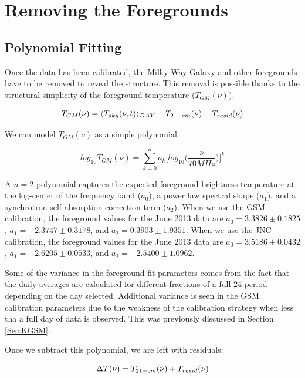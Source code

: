 \section{Removing the Foregrounds}\label{Sec:fore}


\subsection{Polynomial Fitting}

Once the data has been calibrated, the Milky Way Galaxy and other foregrounds have to be removed to reveal the \cm structure. This removal is possible thanks to the structural simplicity of the foreground temperature ($T_{GM}(\nu)$). 

\begin{equation}
T_{GM}(\nu) = \langle T_{sky}(\nu,t) \rangle_{DAY} - T_{21-cm} (\nu) - T_{resid} (\nu)
\end{equation}

We can model $T_{GM} (\nu)$ as a simple polynomial:

\begin{equation}
log_{10} T_{GM}(\nu) = \sum_{k=0}^n a_k \Big[ log_{10} \Big(\frac{\nu}{70 MHz}\Big) \Big]^k
\end{equation}

A $n=2$ polynomial captures the expected foreground brightness temperature at the log-center of the frequency band ($a_0$), a power law spectral shape ($a_1$), and a synchrotron self-absorption correction term ($a_2$). When we use the GSM calibration, the foreground values for the June 2013 data are $a_0 = 3.3826 \pm 0.1825$, $a_1 = -2.3747 \pm 0.3178$, and $a_2 = 0.3903 \pm 1.9351$. When we use the JNC calibration, the foreground values for the June 2013 data are $a_0 = 3.5186 \pm 0.0432$, $a_1 = -2.6205 \pm 0.0533$, and $a_2 = -2.5400 \pm 1.0962$. 

Some of the variance in the foreground fit parameters comes from the fact that the daily averages are calculated for different fractions of a full 24 period depending on the day selected. Additional variance is seen in the GSM calibration parameters due to the weakness of the calibration strategy when less tha a full day of data is observed. This was previously discussed in Section \ref{Sec:KGSM}.

Once we subtract this polynomial, we are left with residuals:

\begin{equation}
\Delta T (\nu) = T_{21-cm}(\nu)+T_{resid}(\nu)
\end{equation}

